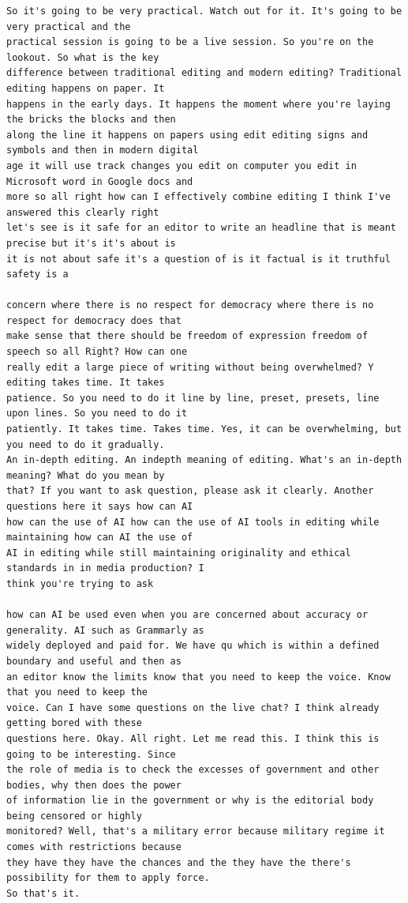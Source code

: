 {\begin{Verbatim}
So it's going to be very practical. Watch out for it. It's going to be very practical and the
practical session is going to be a live session. So you're on the lookout. So what is the key
difference between traditional editing and modern editing? Traditional editing happens on paper. It
happens in the early days. It happens the moment where you're laying the bricks the blocks and then
along the line it happens on papers using edit editing signs and symbols and then in modern digital
age it will use track changes you edit on computer you edit in Microsoft word in Google docs and
more so all right how can I effectively combine editing I think I've answered this clearly right
let's see is it safe for an editor to write an headline that is meant precise but it's it's about is
it is not about safe it's a question of is it factual is it truthful safety is a

concern where there is no respect for democracy where there is no respect for democracy does that
make sense that there should be freedom of expression freedom of speech so all Right? How can one
really edit a large piece of writing without being overwhelmed? Y editing takes time. It takes
patience. So you need to do it line by line, preset, presets, line upon lines. So you need to do it
patiently. It takes time. Takes time. Yes, it can be overwhelming, but you need to do it gradually.
An in-depth editing. An indepth meaning of editing. What's an in-depth meaning? What do you mean by
that? If you want to ask question, please ask it clearly. Another questions here it says how can AI
how can the use of AI how can the use of AI tools in editing while maintaining how can AI the use of
AI in editing while still maintaining originality and ethical standards in in media production? I
think you're trying to ask

how can AI be used even when you are concerned about accuracy or generality. AI such as Grammarly as
widely deployed and paid for. We have qu which is within a defined boundary and useful and then as
an editor know the limits know that you need to keep the voice. Know that you need to keep the
voice. Can I have some questions on the live chat? I think already getting bored with these
questions here. Okay. All right. Let me read this. I think this is going to be interesting. Since
the role of media is to check the excesses of government and other bodies, why then does the power
of information lie in the government or why is the editorial body being censored or highly
monitored? Well, that's a military error because military regime it comes with restrictions because
they have they have the chances and the they have the there's possibility for them to apply force.
So that's it.


\end{Verbatim}}
